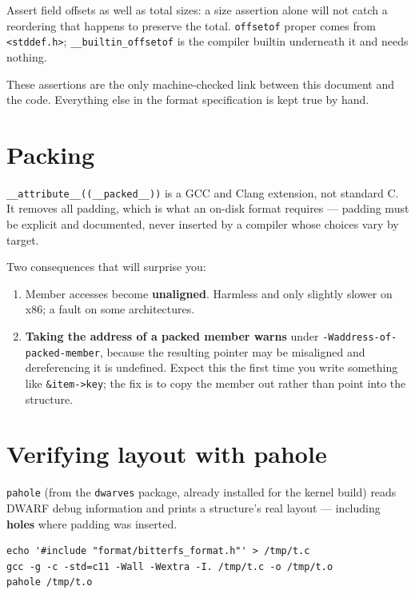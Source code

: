 Assert field offsets as well as total sizes: a size assertion alone will not
catch a reordering that happens to preserve the total. \lstinline|offsetof|
proper comes from \lstinline|<stddef.h>|; \lstinline|__builtin_offsetof| is the
compiler builtin underneath it and needs nothing.

These assertions are the only machine-checked link between this document and the
code. Everything else in the format specification is kept true by hand.

\section{Packing}
\label{sec:packing}

\lstinline|__attribute__((__packed__))| is a GCC and Clang extension, not
standard C. It removes all padding, which is what an on-disk format requires ---
padding must be explicit and documented, never inserted by a compiler whose
choices vary by target.

Two consequences that will surprise you:

\begin{enumerate}
  \item Member accesses become \textbf{unaligned}. Harmless and only slightly
    slower on x86; a fault on some architectures.
  \item \textbf{Taking the address of a packed member warns} under
    \lstinline|-Waddress-of-packed-member|, because the resulting pointer may be
    misaligned and dereferencing it is undefined. Expect this the first time you
    write something like \lstinline|&item->key|; the fix is to copy the member
    out rather than point into the structure.
\end{enumerate}

\section{Verifying layout with pahole}
\label{sec:pahole}

\lstinline|pahole| (from the \lstinline|dwarves| package, already installed for
the kernel build) reads DWARF debug information and prints a structure's real
layout --- including \textbf{holes} where padding was inserted.

\begin{lstlisting}[style=shell]
echo '#include "format/bitterfs_format.h"' > /tmp/t.c
gcc -g -c -std=c11 -Wall -Wextra -I. /tmp/t.c -o /tmp/t.o
pahole /tmp/t.o
\end{lstlisting}

